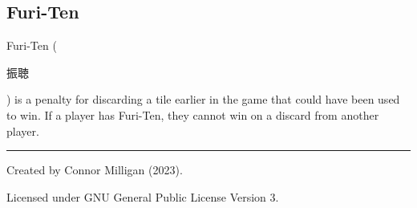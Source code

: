 \documentclass[8pt,landscape]{article}
\begin{document}
\begin{minipage}[t][.8\textheight][t]{\textwidth}
\begin{multicols*}{3}
    \section{Furi-Ten}
    Furi-Ten (\begin{CJK}{UTF8}{min}振聴\end{CJK}) is a penalty for discarding a tile earlier in the game that could have been used to win.
    If a player has Furi-Ten, they cannot win on a discard from another player.\\

    \rule{0.3\linewidth}{0.25pt}
    \scriptsize
    
    Created by Connor Milligan (2023).

    Licensed under GNU General Public License Version 3.
    

\end{multicols*}
\end{minipage}
\end{document}
